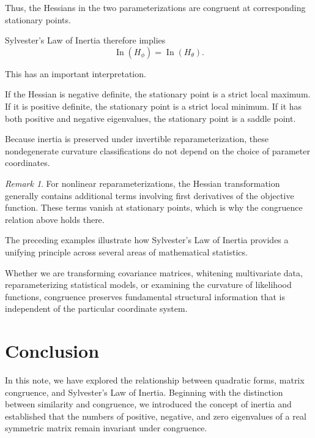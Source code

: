 \documentclass[11pt]{article}
\theoremstyle{definition}
\theoremstyle{remark}
\newtheorem{remark}[theorem]{Remark}
\begin{document}
Thus, the Hessians in the two parameterizations
are congruent at corresponding stationary points.

Sylvester's Law of Inertia therefore implies
\[
    \boxed{
    \operatorname{In}(H_\phi)
    =\operatorname{In}(H_\theta).
    }
\]

This has an important interpretation.

If the Hessian is negative definite, the
stationary point is a strict local maximum.
If it is positive definite, the stationary
point is a strict local minimum.
If it has both positive and negative
eigenvalues, the stationary point is
a saddle point.

Because inertia is preserved under
invertible reparameterization, these
nondegenerate curvature classifications
do not depend on the choice of parameter
coordinates.

\begin{remark}
For nonlinear reparameterizations, the Hessian
transformation generally contains additional
terms involving first derivatives of the
objective function. These terms vanish at
stationary points, which is why the
congruence relation above holds there.
\end{remark}

The preceding examples illustrate how
Sylvester's Law of Inertia provides a
unifying principle across several areas
of mathematical statistics.

Whether we are transforming covariance
matrices, whitening multivariate data,
reparameterizing statistical models, or
examining the curvature of likelihood
functions, congruence preserves fundamental
structural information that is independent
of the particular coordinate system.


\section{Conclusion}

In this note, we have explored the relationship
between quadratic forms, matrix congruence, and
Sylvester's Law of Inertia. Beginning with the
distinction between similarity and congruence,
we introduced the concept of inertia and established
that the numbers of positive, negative, and zero
eigenvalues of a real symmetric matrix remain
invariant under congruence.
\end{document}
